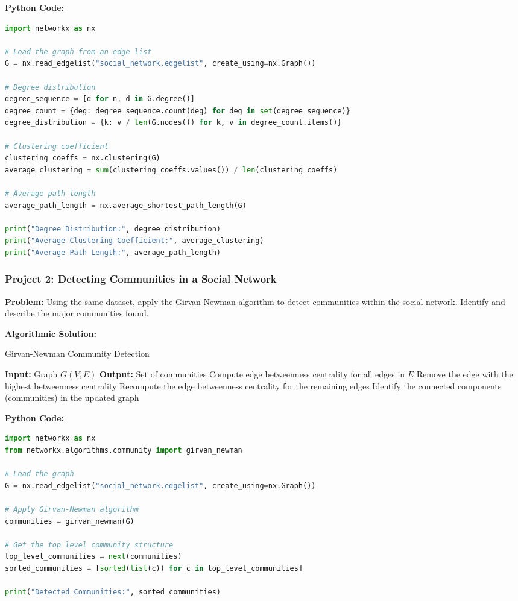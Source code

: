 \documentclass[12pt]{book} %
\begin{document}
\FloatBarrier
\textbf{Python Code:}
\begin{lstlisting}[language=Python]
import networkx as nx

# Load the graph from an edge list
G = nx.read_edgelist("social_network.edgelist", create_using=nx.Graph())

# Degree distribution
degree_sequence = [d for n, d in G.degree()]
degree_count = {deg: degree_sequence.count(deg) for deg in set(degree_sequence)}
degree_distribution = {k: v / len(G.nodes()) for k, v in degree_count.items()}

# Clustering coefficient
clustering_coeffs = nx.clustering(G)
average_clustering = sum(clustering_coeffs.values()) / len(clustering_coeffs)

# Average path length
average_path_length = nx.average_shortest_path_length(G)

print("Degree Distribution:", degree_distribution)
print("Average Clustering Coefficient:", average_clustering)
print("Average Path Length:", average_path_length)
\end{lstlisting}
\FloatBarrier

\subsubsection*{Project 2: Detecting Communities in a Social Network}
\textbf{Problem:} Using the same dataset, apply the Girvan-Newman algorithm to detect communities within the social network. Identify and describe the major communities found.

\textbf{Algorithmic Solution:}
\begin{algorithm}
\caption{Girvan-Newman Community Detection}
\begin{algorithmic}
\State \textbf{Input:} Graph $G(V, E)$
\State \textbf{Output:} Set of communities
\State Compute edge betweenness centrality for all edges in $E$
    \State Remove the edge with the highest betweenness centrality
    \State Recompute the edge betweenness centrality for the remaining edges
    \State Identify the connected components (communities) in the updated graph
\EndWhile
\end{algorithmic}
\end{algorithm}

\FloatBarrier
\textbf{Python Code:}
\begin{lstlisting}[language=Python]
import networkx as nx
from networkx.algorithms.community import girvan_newman

# Load the graph
G = nx.read_edgelist("social_network.edgelist", create_using=nx.Graph())

# Apply Girvan-Newman algorithm
communities = girvan_newman(G)

# Get the top level community structure
top_level_communities = next(communities)
sorted_communities = [sorted(list(c)) for c in top_level_communities]

print("Detected Communities:", sorted_communities)
\end{lstlisting}
\FloatBarrier
\end{document}
